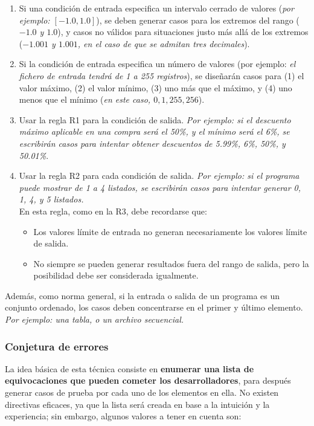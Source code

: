 \begin{enumerate}[R1.]
    \item Si una condición de entrada especifica un intervalo cerrado de valores (\textit{por ejemplo: $[-1.0, 1.0]$}), se deben generar casos para los extremos del rango (\textit{$-1.0$ y $1.0$}), y casos no válidos para situaciones justo más allá de los extremos (\textit{$-1.001$ y $1.001$, en el caso de que se admitan tres decimales}).
    \item Si la condición de entrada especifica un número de valores (por ejemplo: \textit{el fichero de entrada tendrá de 1 a 255 registros}), se diseñarán casos para (1) el valor máximo, (2) el valor mínimo, (3) uno más que el máximo, y (4) uno menos que el mínimo (\textit{en este caso, $0, 1, 255, 256$}).
    \item Usar la regla R1 para la condición de salida. \textit{Por ejemplo: si el descuento máximo aplicable en una compra será el 50\%, y el mínimo será el 6\%, se escribirán casos para intentar obtener descuentos de 5.99\%, 6\%, 50\%, y 50.01\%}.
    \item Usar la regla R2 para cada condición de salida. \textit{Por ejemplo: si el programa puede mostrar de 1 a 4 listados, se escribirán casos para intentar generar 0, 1, 4, y 5 listados.}\\
    En esta regla, como en la R3, debe recordarse que:
    \begin{itemize}
        \item Los valores límite de entrada no generan necesariamente los valores límite de salida.
        \item No siempre se pueden generar resultados fuera del rango de salida, pero la posibilidad debe ser considerada igualmente.
    \end{itemize}
\end{enumerate}

Además, como norma general, si la entrada o salida de un programa es un conjunto ordenado, los casos deben concentrarse en el primer y último elemento. \textit{Por ejemplo: una tabla, o un archivo secuencial.}

\subsubsection{Conjetura de errores}

La idea básica de esta técnica consiste en \textbf{enumerar una lista de equivocaciones que pueden cometer los desarrolladores}, para después generar casos de prueba por cada uno de los elementos en ella. No existen directivas eficaces, ya que la lista será creada en base a la intuición y la experiencia; sin embargo, algunos valores a tener en cuenta son:

